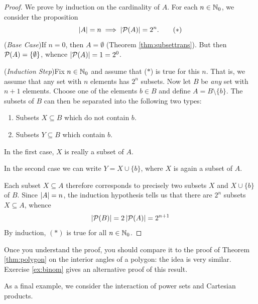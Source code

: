\begin{proof}
	We prove by induction on the cardinality of $A$. For each $n\in\mathbb{N}_0$, we consider the proposition
	\[
		\left| A\right|=n\implies\left| \mathcal{P}(A)\right|=2^n.\tag{$\ast$}
	\]
	(\emph{Base Case})\quad If $n=0$, then $A=\emptyset$ (Theorem \hyperlink{thm:subsettranslnk}{\ref*{thm:subsettrans}}). But then $\mathcal{P}(A)=\{\emptyset\}$, whence $\left| \mathcal{P}(A)\right|=1=2^0$.\par
	(\emph{Induction Step})\quad Fix $n\in\mathbb{N}_0$ and assume that ($\ast$) is true for this $n$. That is, we assume that any set with $n$ elements has $2^n$ subsets. Now let $B$ be \emph{any} set with $n+1$ elements. Choose one of the elements $b\in B$ and define $A=B\setminus\{b\}$. The subsets of $B$ can then be separated into the following two types:
	\begin{enumerate}\itemsep0pt
	  \item Subsets $X\subseteq B$ which do not contain $b$.
	  \item Subsets $Y\subseteq B$ which contain $b$.
	\end{enumerate}
	In the first case, $X$ is really a subset of $A$.\par
	In the second case we can write $Y=X\cup\{b\}$, where $X$ is again a subset of $A$.\par
	Each subset $X\subseteq A$ therefore corresponds to precisely two subsets $X$ and $X\cup\{b\}$ of $B$. Since $\left| A\right|=n$, the induction hypothesis tells us that there are $2^n$ subsets $X\subseteq A$, whence
	\[
		\left| \mathcal{P}(B)\right|=2\left| \mathcal{P}(A)\right|=2^{n+1}
	\]
	By induction, $(\ast)$ is true for all $n\in\mathbb{N}_0$.
\end{proof}

Once you understand the proof, you should compare it to the proof of Theorem \ref{thm:polygon} on the interior angles of a polygon: the idea is very similar. Exercise \ref{ex:binom} gives an alternative proof of this result.\par

As a final example, we consider the interaction of power sets and Cartesian products.


